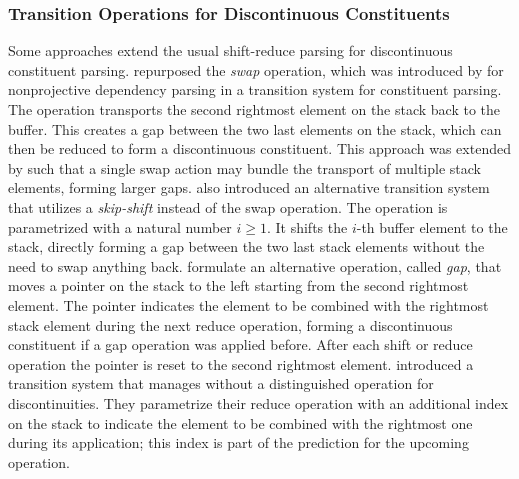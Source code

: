 \documentclass[../document.tex]{subfiles}
\begin{document}
    \subsubsection*{Transition Operations for Discontinuous Constituents}
    Some approaches extend the usual shift-reduce parsing for discontinuous constituent parsing.
     repurposed the \emph{swap} operation, which was introduced by \citet{Nivre09} for nonprojective dependency parsing in a transition system for constituent parsing.
    The operation transports the second rightmost element on the stack back to the buffer.
    This creates a gap between the two last elements on the stack, which can then be reduced to form a discontinuous constituent.
    This approach was extended by \citet{Maier15} such that a single swap action may bundle the transport of multiple stack elements, forming larger gaps.
     also introduced an alternative transition system that utilizes a \emph{skip-shift} instead of the swap operation.
    The operation is parametrized with a natural number \(i \ge 1\). It shifts the \(i\)-th buffer element to the stack, directly forming a gap between the two last stack elements without the need to swap anything back.
     formulate an alternative operation, called \emph{gap}, that moves a pointer on the stack to the left starting from the second rightmost element.
    The pointer indicates the element to be combined with the rightmost stack element during the next reduce operation, forming a discontinuous constituent if a gap operation was applied before.
    After each shift or reduce operation the pointer is reset to the second rightmost element.
     introduced a transition system that manages without a distinguished operation for discontinuities.
    They parametrize their reduce operation with an additional index on the stack to indicate the element to be combined with the rightmost one during its application; this index is part of the prediction for the upcoming operation.
\end{document}

